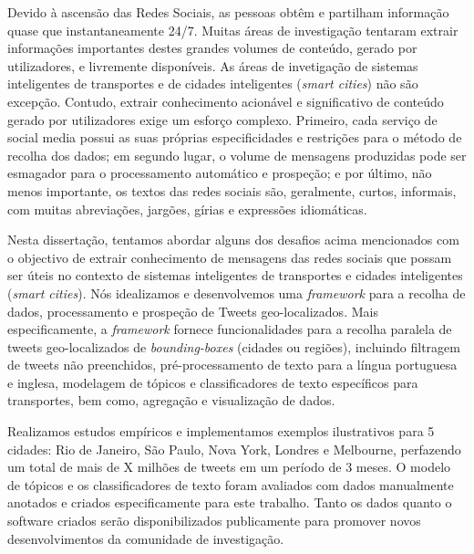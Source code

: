 Devido à ascensão das Redes Sociais, as pessoas obtêm e partilham informação quase que instantaneamente 24/7. Muitas áreas de investigação tentaram extrair informações importantes destes grandes volumes de conteúdo, gerado por utilizadores, e livremente disponíveis. As áreas de invetigação de sistemas inteligentes de transportes e de cidades inteligentes (\textit{smart cities}) não são excepção. Contudo, extrair conhecimento acionável e significativo de conteúdo gerado por utilizadores exige um esforço complexo. Primeiro, cada serviço de social media possui as suas próprias especificidades e restrições para o método de recolha dos dados; em segundo lugar, o volume de mensagens produzidas pode ser esmagador para o processamento automático e prospeção; e por último, não menos importante, os textos das redes sociais são, geralmente, curtos, informais, com muitas abreviações, jargões, gírias e expressões idiomáticas. 

Nesta dissertação, tentamos abordar alguns dos desafios acima mencionados com o objectivo de extrair conhecimento de mensagens das redes sociais que possam ser úteis no contexto de sistemas inteligentes de transportes e cidades inteligentes (\textit{smart cities}). Nós idealizamos e desenvolvemos uma \textit{framework} para a recolha de dados, processamento e prospeção de Tweets geo-localizados. Mais especificamente, a \textit{framework} fornece funcionalidades para a recolha paralela de tweets geo-localizados de \textit{bounding-boxes} (cidades ou regiões), incluindo filtragem de tweets não preenchidos, pré-processamento de texto para a língua portuguesa e inglesa, modelagem de tópicos e classificadores de texto específicos para transportes, bem como, agregação e visualização de dados.

Realizamos estudos empíricos e implementamos exemplos ilustrativos para 5 cidades: Rio de Janeiro, São Paulo, Nova York, Londres e Melbourne, perfazendo um total de mais de X milhões de tweets em um período de 3 meses. O modelo de tópicos e os classificadores de texto foram avaliados com dados manualmente anotados e criados especificamente para este trabalho. Tanto os dados quanto o software criados serão disponibilizados publicamente para promover novos desenvolvimentos da comunidade de investigação.